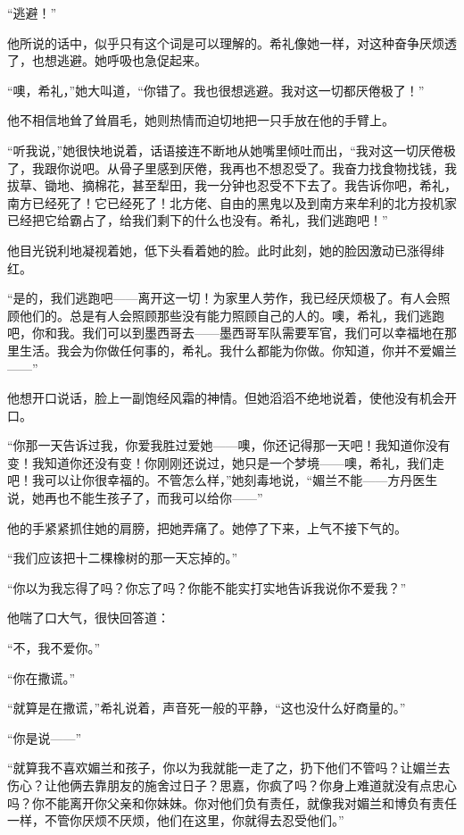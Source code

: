 \par “逃避！”
\par 他所说的话中，似乎只有这个词是可以理解的。希礼像她一样，对这种奋争厌烦透了，也想逃避。她呼吸也急促起来。
\par “噢，希礼，”她大叫道，“你错了。我也很想逃避。我对这一切都厌倦极了！”
\par 他不相信地耸了耸眉毛，她则热情而迫切地把一只手放在他的手臂上。
\par “听我说，”她很快地说着，话语接连不断地从她嘴里倾吐而出，“我对这一切厌倦极了，我跟你说吧。从骨子里感到厌倦，我再也不想忍受了。我奋力找食物找钱，我拔草、锄地、摘棉花，甚至犁田，我一分钟也忍受不下去了。我告诉你吧，希礼，南方已经死了！它已经死了！北方佬、自由的黑鬼以及到南方来牟利的北方投机家已经把它给霸占了，给我们剩下的什么也没有。希礼，我们逃跑吧！”
\par 他目光锐利地凝视着她，低下头看着她的脸。此时此刻，她的脸因激动已涨得绯红。
\par “是的，我们逃跑吧——离开这一切！为家里人劳作，我已经厌烦极了。有人会照顾他们的。总是有人会照顾那些没有能力照顾自己的人的。噢，希礼，我们逃跑吧，你和我。我们可以到墨西哥去——墨西哥军队需要军官，我们可以幸福地在那里生活。我会为你做任何事的，希礼。我什么都能为你做。你知道，你并不爱媚兰——”
\par 他想开口说话，脸上一副饱经风霜的神情。但她滔滔不绝地说着，使他没有机会开口。
\par “你那一天告诉过我，你爱我胜过爱她——噢，你还记得那一天吧！我知道你没有变！我知道你还没有变！你刚刚还说过，她只是一个梦境——噢，希礼，我们走吧！我可以让你很幸福的。不管怎么样，”她刻毒地说，“媚兰不能——方丹医生说，她再也不能生孩子了，而我可以给你——”
\par 他的手紧紧抓住她的肩膀，把她弄痛了。她停了下来，上气不接下气的。
\par “我们应该把十二棵橡树的那一天忘掉的。”
\par “你以为我忘得了吗？你忘了吗？你能不能实打实地告诉我说你不爱我？”
\par 他喘了口大气，很快回答道：
\par “不，我不爱你。”
\par “你在撒谎。”
\par “就算是在撒谎，”希礼说着，声音死一般的平静，“这也没什么好商量的。”
\par “你是说——”
\par “就算我不喜欢媚兰和孩子，你以为我就能一走了之，扔下他们不管吗？让媚兰去伤心？让他俩去靠朋友的施舍过日子？思嘉，你疯了吗？你身上难道就没有点忠心吗？你不能离开你父亲和你妹妹。你对他们负有责任，就像我对媚兰和博负有责任一样，不管你厌烦不厌烦，他们在这里，你就得去忍受他们。”
